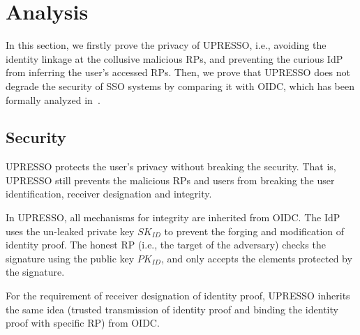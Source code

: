 \section{Analysis}
\label{sec:analysis}
In this section, we firstly prove the privacy of UPRESSO, i.e., avoiding the identity linkage at the collusive malicious RPs,
and preventing the curious IdP from inferring the user's accessed RPs.
Then, we prove that UPRESSO does not degrade the security of SSO systems by comparing it with OIDC, which has been formally analyzed in~\cite{FettKS17}.


\subsection{Security}
\label{subsec:security}
UPRESSO protects the user's privacy without breaking the security. That is, UPRESSO still prevents the malicious RPs and users from breaking the user identification, receiver designation and integrity.

In UPRESSO, all mechanisms for integrity are inherited from OIDC. The IdP uses the un-leaked private key $SK_{ID}$ to prevent the forging and modification of identity proof. The honest RP (i.e., the target of the adversary) checks the signature using the public key $PK_{ID}$, and only accepts the elements protected by the signature.

For the requirement of receiver designation of identity proof, UPRESSO inherits the same idea (trusted transmission of identity proof and binding the identity proof with specific RP) from OIDC.


